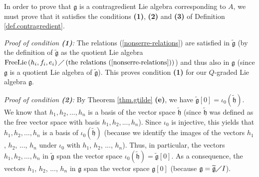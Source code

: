 \documentclass[etingof-lie.tex]{subfiles}
\begin{document}
In order to prove that $\mathfrak{g}$ is a contragredient Lie algebra
corresponding to $A$, we must prove that it satisfies the conditions
\textbf{(1)}, \textbf{(2)} and \textbf{(3)} of Definition
\ref{def.contragredient}.

\textit{Proof of condition \textbf{(1)}:} The relations
(\ref{nonserre-relations}) are satisfied in $\widetilde{\mathfrak{g}}$ (by the
definition of $\widetilde{\mathfrak{g}}$ as the quotient Lie algebra
$\operatorname*{FreeLie}\left(  h_{i},f_{i},e_{i}\right)  \diagup\left(
\text{the relations (\ref{nonserre-relations})}\right)  $) and thus also in
$\mathfrak{g}$ (since $\mathfrak{g}$ is a quotient Lie algebra of
$\widetilde{\mathfrak{g}}$). This proves condition \textbf{(1)} for our
$Q$-graded Lie algebra $\mathfrak{g}$.

\textit{Proof of condition \textbf{(2)}:} By Theorem \ref{thm.gtilde}
\textbf{(e)}, we have $\widetilde{\mathfrak{g}}\left[  0\right]  =\iota
_{0}\left(  \widetilde{\mathfrak{h}}\right)  $. We know that $h_{1}%
,h_{2},...,h_{n}$ is a basis of the vector space $\widetilde{\mathfrak{h}}$
(since $\widetilde{\mathfrak{h}}$ was defined as the free vector space with
basis $h_{1},h_{2},...,h_{n}$). Since $\iota_{0}$ is injective, this yields
that $h_{1},h_{2},...,h_{n}$ is a basis of $\iota_{0}\left(
\widetilde{\mathfrak{h}}\right)  $ (because we identify the images of the
vectors $h_{1}$, $h_{2}$, $...$, $h_{n}$ under $\iota_{0}$ with $h_{1}$,
$h_{2}$, $...$, $h_{n}$). Thus, in particular, the vectors $h_{1}%
,h_{2},...,h_{n}$ in $\widetilde{\mathfrak{g}}$ span the vector space
$\iota_{0}\left(  \widetilde{\mathfrak{h}}\right)  =\widetilde{\mathfrak{g}%
}\left[  0\right]  $. As a consequence, the vectors $h_{1}$, $h_{2}$, $...$,
$h_{n}$ in $\mathfrak{g}$ span the vector space $\mathfrak{g}\left[  0\right]
$ (because $\mathfrak{g}=\widetilde{\mathfrak{g}}\diagup I$).
\end{document}
